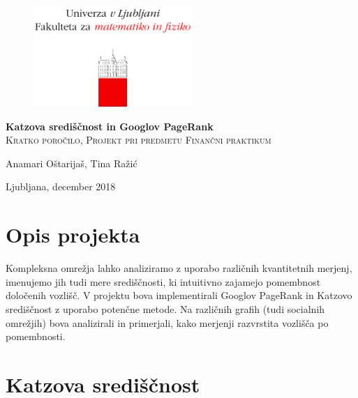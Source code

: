 \documentclass[a4paper]{article}
\begin{document}
\thispagestyle{empty}

\begin{figure}[t]
\begin{center} 
\includegraphics[width=6cm]{fmf.png}\\[4cm]
\end{center}
\end{figure}

\begin{center}
\Huge\textbf{Katzova središčnost in Googlov PageRank}\\[0.5cm]
\large\textsc{Kratko poročilo, Projekt pri predmetu Finančni praktikum}\\[4cm]
\end{center}

\begin{flushleft}

\end{flushleft}
\vspace{\fill}
\begin{flushright}
Anamari Oštarijaš, Tina Ražić
\end{flushright}

\begin{flushleft}
Ljubljana, december 2018
\end{flushleft}

\newpage
\tableofcontents

\newpage
\section{Opis projekta}
\hspace{4.8mm}Kompleksna omrežja lahko analiziramo z uporabo različnih kvantitetnih merjenj, imenujemo jih tudi mere središčnosti,  ki intuitivno zajamejo pomembnost določenih vozlišč. 
V projektu bova implementirali Googlov PageRank in Katzovo središčnost z uporabo potenčne metode. Na različnih grafih (tudi socialnih omrežjih) bova analizirali in primerjali, kako merjenji razvrstita vozlišča po pomembnosti. 

\section{Katzova središčnost}
\end{document}
